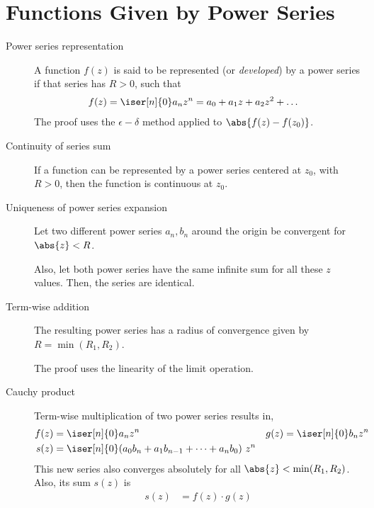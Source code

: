 \section{Functions Given by Power Series}

\begin{description}
    \item[Power series representation] A function $ f(z) $ is said to be represented
        (or \emph{developed}) by a power series if that series has $ R > 0 $, such that
        \begin{align}
            f(z) & = \iser[n]{0} a_n z^n = a_0 + a_1 z + a_2 z^2 + \dots
        \end{align}
        The proof uses the $ \epsilon-\delta $ method applied to $ \abs{f(z) - f(z_0)} $.

    \item[Continuity of series sum] If a function can be represented by a power series
        centered at $ z_0 $, with $ R > 0 $, then the function is continuous at $ z_0 $.

    \item[Uniqueness of power series expansion] Let two different power series
        $ a_n, b_n $ around the origin be convergent for $ \abs{z} < R $.  \par
        Also, let both power series have the same infinite sum for all these $ z $ values.
        Then, the series are identical.

    \item[Term-wise addition] The resulting power series has a radius of convergence
        given by $ R = \min(R_1, R_2) $. \par
        The proof uses the linearity of the limit operation.

    \item[Cauchy product] Term-wise multiplication of two power series results in,
        \begin{align}
            f(z) & = \iser[n]{0} a_n z^n                                     &
            g(z) & = \iser[n]{0} b_n z^n                                       \\
            s(z) & = \iser[n]{0} (a_0b_n + a_1b_{n-1} + \dots + a_nb_0)\ z^n
        \end{align}
        This new series also converges absolutely for all $ \abs{z} < \min(R_1, R_2) $.
        Also, its sum $ s(z) $ is
        \begin{align}
            s(z) & = f(z) \cdot g(z)
        \end{align}


\end{description}
